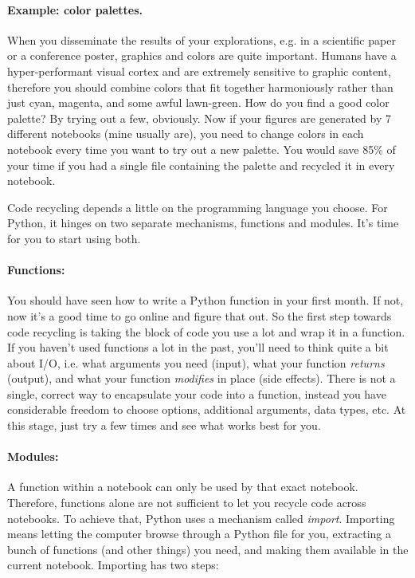 \documentclass[12pt,a4paper,notitlepage,onecolumn]{article}
\begin{document}
\paragraph{Example: color palettes.} When you disseminate the results of your explorations, e.g. in a scientific paper or a conference poster, graphics and colors are quite important. Humans have a hyper-performant visual cortex and are extremely sensitive to graphic content, therefore you should combine colors that fit together harmoniously rather than just cyan, magenta, and some awful lawn-green. How do you find a good color palette? By trying out a few, obviously. Now if your figures are generated by 7 different notebooks (mine usually are), you need to change colors in each notebook every time you want to try out a new palette. You would save 85\% of your time if you had a single file containing the palette and recycled it in every notebook.

Code recycling depends a little on the programming language you choose. For Python, it hinges on two separate mechanisms, functions and modules. It's time for you to start using both.

\paragraph{Functions:} You should have seen how to write a Python function in your first month. If not, now it's a good time to go online and figure that out. So the first step towards code recycling is taking the block of code you use a lot and wrap it in a function. If you haven't used functions a lot in the past, you'll need to think quite a bit about I/O, i.e. what arguments you need (input), what your function \textit{returns} (output), and what your function \textit{modifies} in place (side effects). There is not a single, correct way to encapsulate your code into a function, instead you have considerable freedom to choose options, additional arguments, data types, etc. At this stage, just try a few times and see what works best for you.

\paragraph{Modules:} A function within a notebook can only be used by that exact notebook. Therefore, functions alone are not sufficient to let you recycle code across notebooks. To achieve that, Python uses a mechanism called \textit{import}. Importing means letting the computer browse through a Python file for you, extracting a bunch of functions (and other things) you need, and making them available in the current notebook. Importing has two steps:
\end{document}
